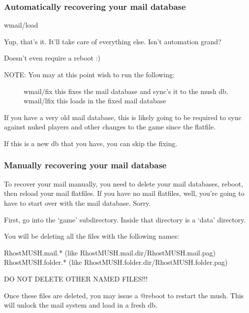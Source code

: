 \documentclass[letterpaper,10pt,english]{sphinxmanual}
\begin{document}
\subsubsection{Automatically recovering your mail database}
\label{\detokenize{troubleshooting:automatically-recovering-your-mail-database}}
\sphinxAtStartPar
wmail/load

\sphinxAtStartPar
Yup, that’s it.  It’ll take care of everything else.  Isn’t automation grand?

\sphinxAtStartPar
Doesn’t even require a reboot :)
\begin{description}
\item[{NOTE:  You may at this point wish to run the following:}] \leavevmode
\sphinxAtStartPar
wmail/fix  \textendash{} this fixes the mail database and sync’s it to the mush db.
wmail/lfix \textendash{} this loads in the fixed mail database

\end{description}

\sphinxAtStartPar
If you have a very old mail database, this is likely going to be required
to sync against nuked players and other changes to the game since the flatfile.

\sphinxAtStartPar
If this is a new db that you have, you can skip the fixing.


\subsubsection{Manually recovering your mail database}
\label{\detokenize{troubleshooting:manually-recovering-your-mail-database}}
\sphinxAtStartPar
To recover your mail manually, you need to delete your mail databases,
reboot, then reload your mail flatfiles.  If you have no mail flatfiles,
well, you’re going to have to start over with the mail database.  Sorry.

\sphinxAtStartPar
First, go into the ‘game’ subdirectory.  Inside that directory is a ‘data’
directory.

\sphinxAtStartPar
You will be deleting all the files with the following names:

\sphinxAtStartPar
RhostMUSH.mail.*                (like RhostMUSH.mail.dir/RhostMUSH.mail.pag)
RhostMUSH.folder.*              (like RhostMUSH.folder.dir/RhostMUSH.folder.pag)

\sphinxAtStartPar
DO NOT DELETE OTHER NAMED FILES!!!

\sphinxAtStartPar
Once these files are deleted, you may issue a @reboot to restart the mush.
This will unlock the mail system and load in a fresh db.
\end{document}
